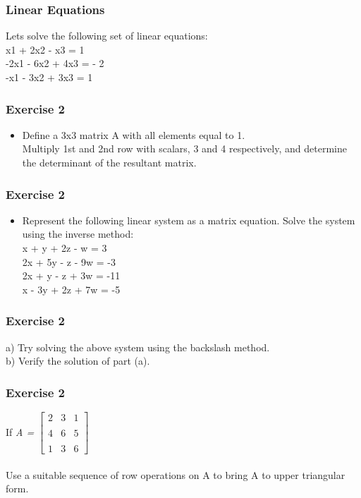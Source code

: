 \documentclass[17pt]{beamer}
\begin{document}
\begin{frame}[fragile]
\frametitle{Linear Equations}
Lets solve the following set of linear equations: \\
x1 + 2x2 - x3 = 1 \\
-2x1 - 6x2 + 4x3 = - 2 \\
-x1 - 3x2 + 3x3 = 1 \\
\end{frame}

\begin{frame}[fragile]
\frametitle{Exercise 2}
\begin{itemize}
\item Define a 3x3 matrix A with all elements equal to 1. \\ Multiply 1st and 2nd row with scalars, 3 and 4 respectively, and determine the determinant of the resultant matrix. 
\end{itemize}
\end{frame}

\begin{frame}[fragile]
\frametitle{Exercise 2}
\begin{itemize}
\item Represent the following linear system as a matrix equation. Solve the system using the inverse method:\\
\quad \quad x + y + 2z - w = 3 \\
\quad \quad 2x + 5y - z - 9w = -3 \\
\quad \quad 2x + y - z + 3w = -11 \\
\quad \quad x - 3y + 2z + 7w = -5 \\
\end{itemize}
\end{frame}

\begin{frame}[fragile]
\frametitle{Exercise 2}
a) Try solving the above system using the backslash method.\\
b) Verify the solution of part (a).\\
\end{frame}

\begin{frame}[fragile]
\frametitle{Exercise 2}
If \textsl{A = $\left[
               \begin{array}{ccc}
                 2 & 3 & 1  \\ \\
                 4 & 6 & 5 \\ \\
                 1 & 3 & 6
              \end{array}
             \right]$ }\\ \\ 
Use a suitable sequence of row operations on A to bring A to upper triangular form.

\end{frame}
\end{document}
